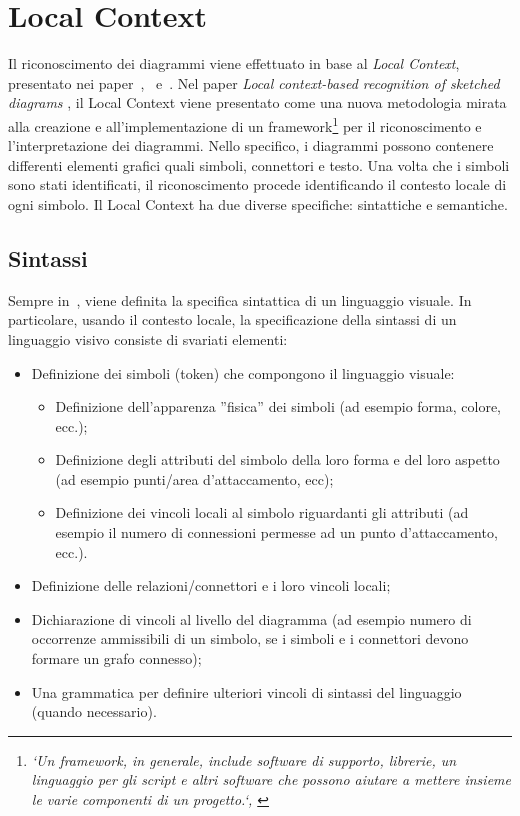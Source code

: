 \chapter{Local Context}\label{ch:localcontext}
    Il riconoscimento dei diagrammi viene effettuato in base al \textit{Local Context}, presentato nei paper~\cite{localcontext_recognition},~\cite{extending_localcontext} e~\cite{localcontext}.
    \newline
    Nel paper \textit{Local context-based recognition of sketched diagrams} \cite{localcontext_recognition}, il Local Context viene presentato come una nuova metodologia mirata alla creazione e all'implementazione di un framework\footnote{\textit{`Un framework, in generale, include software di supporto, librerie, un linguaggio per gli script e altri software che possono aiutare a mettere insieme le varie componenti di un progetto.`, \cite{framework}}} per il riconoscimento e l'interpretazione dei diagrammi. Nello specifico, i diagrammi possono contenere differenti elementi grafici quali simboli, connettori e testo. Una volta che i simboli sono stati identificati, il riconoscimento procede identificando il contesto locale di ogni simbolo.
    Il Local Context ha due diverse specifiche: sintattiche e semantiche.
    \section{Sintassi}
        Sempre in~\cite{localcontext_recognition}, viene definita la specifica sintattica di un linguaggio visuale.
        In particolare, usando il contesto locale, la specificazione della sintassi di un linguaggio visivo consiste di svariati elementi:
        \begin{itemize}
            \item Definizione dei simboli (token) che compongono il linguaggio visuale:
            \begin{itemize}
                \item Definizione dell'apparenza ''fisica'' dei simboli (ad esempio forma, colore, ecc.);
                \item Definizione degli attributi del simbolo della loro forma e del loro aspetto (ad esempio punti/area d'attaccamento, ecc);
                \item Definizione dei vincoli locali al simbolo riguardanti gli attributi (ad esempio il numero di connessioni permesse ad un punto d'attaccamento, ecc.).
            \end{itemize}
            \item Definizione delle relazioni/connettori e i loro vincoli locali;
            \item Dichiarazione di vincoli al livello del diagramma (ad esempio numero di occorrenze ammissibili di un simbolo, se i simboli e i connettori devono formare un grafo connesso);
            \item Una grammatica per definire ulteriori vincoli di sintassi del linguaggio (quando necessario).
        \end{itemize}

